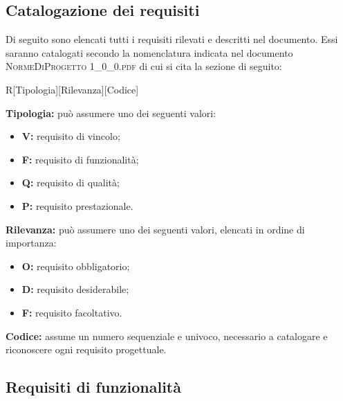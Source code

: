 \newpage
\subsection{Catalogazione dei requisiti}

Di seguito sono elencati tutti i requisiti rilevati e descritti nel documento. Essi saranno catalogati secondo la nomenclatura indicata nel documento \textsc{NormeDiProgetto 1\_0\_0.pdf} di cui si cita la sezione di seguito:

\begin{center}
	R[Tipologia][Rilevanza][Codice]
\end{center}
\textbf{Tipologia:} può assumere uno dei seguenti valori:
\begin{itemize}
	\item \textbf{V:} requisito di vincolo;
	\item \textbf{F:} requisito di funzionalità;
	\item \textbf{Q:} requisito di qualità;
	\item \textbf{P:} requisito prestazionale.
\end{itemize}
\textbf{Rilevanza:} può assumere uno dei seguenti valori, elencati in ordine di importanza:
\begin{itemize}
	\item \textbf{O:} requisito obbligatorio;
	\item \textbf{D:} requisito desiderabile;
	\item \textbf{F:} requisito facoltativo.
\end{itemize}
\textbf{Codice:} assume un numero sequenziale e univoco, necessario a catalogare e riconoscere ogni requisito progettuale.

\subsection{Requisiti di funzionalità}


